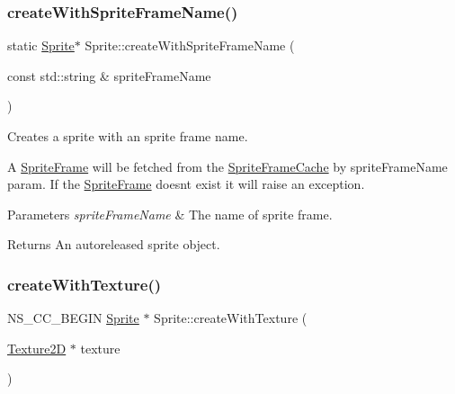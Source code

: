 \subsubsection{\texorpdfstring{create\+With\+Sprite\+Frame\+Name()}{createWithSpriteFrameName()}\hspace{0.1cm}{\footnotesize\ttfamily [2/2]}}
{\footnotesize\ttfamily static \hyperlink{classSprite}{Sprite}$\ast$ Sprite\+::create\+With\+Sprite\+Frame\+Name (\begin{DoxyParamCaption}\item[{const std\+::string \&}]{sprite\+Frame\+Name }\end{DoxyParamCaption})\hspace{0.3cm}{\ttfamily [static]}}

Creates a sprite with an sprite frame name.

A \hyperlink{classSpriteFrame}{Sprite\+Frame} will be fetched from the \hyperlink{classSpriteFrameCache}{Sprite\+Frame\+Cache} by sprite\+Frame\+Name param. If the \hyperlink{classSpriteFrame}{Sprite\+Frame} doesn\textquotesingle{}t exist it will raise an exception.


\begin{DoxyParams}{Parameters}
{\em sprite\+Frame\+Name} & The name of sprite frame. \\
\hline
\end{DoxyParams}
\begin{DoxyReturn}{Returns}
An autoreleased sprite object. 
\end{DoxyReturn}
\mbox{\label{classSprite_a8d9023960cc3b3d3b6c8109e0a778cdc}} 
\subsubsection{\texorpdfstring{create\+With\+Texture()}{createWithTexture()}\hspace{0.1cm}{\footnotesize\ttfamily [1/4]}}
{\footnotesize\ttfamily N\+S\+\_\+\+C\+C\+\_\+\+B\+E\+G\+IN \hyperlink{classSprite}{Sprite} $\ast$ Sprite\+::create\+With\+Texture (\begin{DoxyParamCaption}\item[{\hyperlink{classTexture2D}{Texture2D} $\ast$}]{texture }\end{DoxyParamCaption})\hspace{0.3cm}{\ttfamily [static]}}

